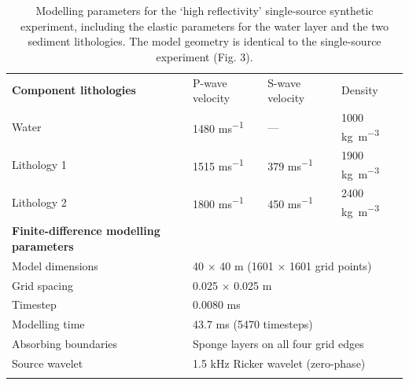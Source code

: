 \documentclass[se,manuscript]{copernicus}
\begin{document}
\begin{table}
    \caption{Modelling parameters for the `high reflectivity' single-source synthetic experiment, including the elastic parameters for the water layer and the two sediment lithologies. The model geometry is identical to the single-source experiment (Fig. 3).}
    \label{table:single-source-high-reflectivity-parameters}
    \begin{tabular}{llll}
        \tophline
        \textbf{Component lithologies} & P-wave velocity & S-wave velocity & Density \\
        \middlehline
        Water & 1480 \unit{ms^{-1}} & --- & 1000 \unit{kg m^{-3}} \\
        Lithology 1 & 1515 \unit{ms^{-1}} & 379 \unit{ms^{-1}} & 1900 \unit{kg m^{-3}} \\
        Lithology 2 & 1800 \unit{ms^{-1}} & 450 \unit{ms^{-1}} & 2400 \unit{kg m^{-3}} \\
        \middlehline
        \textbf{Finite-difference modelling parameters} \\
        \middlehline
        Model dimensions & \multicolumn{3}{l}{40 $\times$ 40 \unit{m} (1601 $\times$ 1601 grid points)} \\
        Grid spacing & \multicolumn{3}{l}{0.025 $\times$ 0.025 \unit{m}} \\
        Timestep & \multicolumn{3}{l}{0.0080 \unit{ms}}\\
        Modelling time & \multicolumn{3}{l}{43.7 \unit{ms} (5470 timesteps)} \\
        Absorbing boundaries & \multicolumn{3}{l}{Sponge layers on all four grid edges} \\
        Source wavelet & \multicolumn{3}{l}{1.5 \unit{kHz} Ricker wavelet (zero-phase)} \\
        \bottomhline
    \end{tabular}
\end{table}
\end{document}
